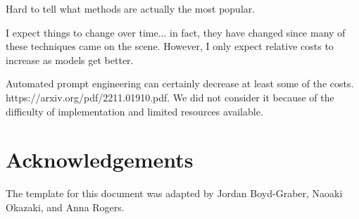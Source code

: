 \documentclass[11pt]{article}
\begin{document}
Hard to tell what methods are actually the most popular.

I expect things to change over time... in fact, they have changed since many of these techniques came on the scene. However, I only expect relative costs to increase as models get better.

Automated prompt engineering can certainly decrease at least some of the costs. https://arxiv.org/pdf/2211.01910.pdf. We did not consider it because of the difficulty of implementation and limited resources available.

\section*{Acknowledgements}
The template for this document was adapted by Jordan Boyd-Graber, Naoaki Okazaki, and Anna Rogers.



\end{document}
